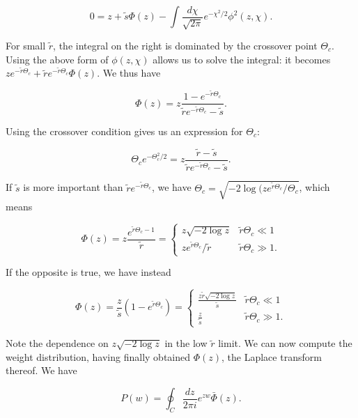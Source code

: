 \documentclass[10pt]{revtex4}
\begin{document}
\begin{equation}
0 = z + \tilde{s}\Phi(z) - \int \frac{d\chi}{\sqrt{2\pi}}e^{-\chi^2/2}\phi^2(z,\chi).
\end{equation}

For small $\tilde{r}$, the integral on the right is dominated by the crossover point $\Theta_c$. Using the above form of $\phi(z,\chi)$ allows us to solve the integral: it becomes $ze^{-\tilde{r}\Theta_c} + \tilde{r}e^{-\tilde{r}\Theta_c}\Phi(z)$. We thus have

\begin{equation}
\Phi(z) = z\frac{1-e^{-\tilde{r}\Theta_c}}{\tilde{r}e^{-\tilde{r}\Theta_c} - \tilde{s}}.
\end{equation}

Using the crossover condition gives us an expression for $\Theta_c$:

\begin{equation}
\Theta_c e^{-\Theta_c^2/2} = z\frac{\tilde{r}-\tilde{s}}{\tilde{r}e^{-\tilde{r}\Theta_c} - \tilde{s}}.
\end{equation}

If $\tilde{s}$ is more important than $\tilde{r}e^{-\tilde{r}\Theta_c}$, we have $\Theta_c = \sqrt{-2\log(ze^{\tilde{r}\Theta_c}/\Theta_c}$, which means

\begin{equation}
\Phi(z) = z\frac{e^{\tilde{r}\Theta_c - 1}}{\tilde{r}} =
\begin{cases}
z\sqrt{-2\log z} & \tilde{r}\Theta_c \ll 1 \\
ze^{\tilde{r}\Theta_c}/\tilde{r} & \tilde{r}\Theta_c \gg 1.
\end{cases}
\end{equation}

If the opposite is true, we have instead

\begin{equation}
\Phi(z) = \frac{z}{\tilde{s}}(1-e^{\tilde{r}\Theta_c}) =
\begin{cases}
\frac{z\tilde{r}\sqrt{-2\log z}}{\tilde{s}} & \tilde{r}\Theta_c \ll 1 \\
\frac{z}{\tilde{s}} & \tilde{r}\Theta_c \gg 1.
\end{cases}
\end{equation}

Note the dependence on $z\sqrt{-2\log z}$ in the low $\tilde{r}$ limit.
We can now compute the weight distribution, having finally obtained $\Phi(z)$, the Laplace transform thereof.
We have

\begin{equation}
P(w) = \oint_C \frac{dz}{2\pi i}e^{zw}\bar{\Phi}(z).
\end{equation}
\end{document}
